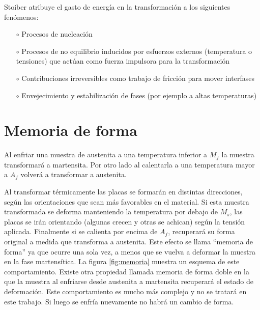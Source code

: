 \documentclass[a4paper,12pt,fleqn,twoside,openany]{book}
\begin{document}
 
Stoiber \cite{stoiber} atribuye el gasto de energía en la transformación a los siguientes fenómenos:
\begin{itemize}
 \item[$\circ$] Procesos de nucleación
 \item[$\circ$] Procesos de no equilibrio inducidos por esfuerzos externos (temperatura o tensiones) que actúan como fuerza impulsora para la 
 transformación
 \item[$\circ$] Contribuciones irreversibles como trabajo de fricción para mover interfases
 \item[$\circ$] Envejecimiento y estabilización de fases (por ejemplo a altas temperaturas) 
\end{itemize}



\section{Memoria de forma}

 Al enfriar una muestra de austenita a una temperatura inferior a $M_{f}$ la muestra transformará a martensita. Por otro lado al calentarla a una temperatura mayor a $A_{f}$ volverá a transformar a austenita. 
 
 Al transformar térmicamente las placas se formarán en distintas direcciones, según las orientaciones que sean más favorables en el material. Si esta muestra transformada se deforma manteniendo la temperatura por debajo de $M_s$, las placas se irán orientando (algunas crecen y otras se achican) según la tensión aplicada. Finalmente si se calienta por encima de $A_{f}$, recuperará su forma original a medida que transforma a austenita. Este efecto se llama “memoria de forma” ya que ocurre una sola vez, a menos que se vuelva a deformar la muestra en la fase martensítica. La figura \ref{fig:memoria} muestra un esquema de este comportamiento. Existe otra propiedad llamada memoria de forma doble en la que la muestra al 
enfriarse desde austenita a martensita recuperará el estado de deformación. Este comportamiento es mucho más complejo y no se tratará en este trabajo. Si luego se enfría nuevamente no habrá un cambio de forma.
\end{document}
